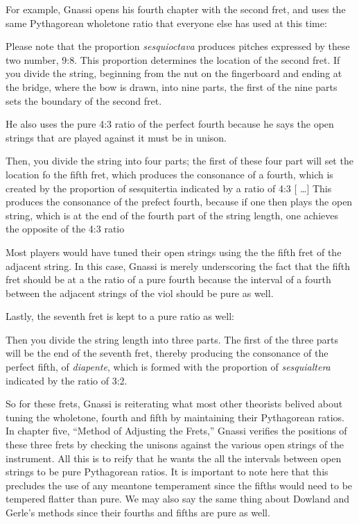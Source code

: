 For example, Gnassi opens his fourth chapter with the second fret, and uses the same
Pythagorean wholetone ratio that everyone else has used at this time:

\begin{blocks}
Please note that the proportion \emph{sesquioctava} produces pitches expressed
by these two number, 9:8.  This proportion determines the location of the second
fret.  If you divide the string, beginning from the nut on the fingerboard and
ending at the bridge, where the bow is drawn, into nine parts, the first of the
nine parts sets the boundary of the second fret.
\end{blocks}

He also uses the pure 4:3 ratio of the
perfect fourth because he says the open strings that are played against it must
be in unison.

\begin{blocks}
Then, you divide the string into four parts; the first of these four part will
set the location fo the fifth fret, which produces the consonance of a fourth,
which is created by the proportion of sesquitertia indicated by a ratio of 4:3
[ \ldots ] This produces the consonance of the prefect fourth, because if
one then plays the open string, which is at the end of the fourth part of the
string length, one achieves the opposite of the 4:3 ratio
\end{blocks}

Most players would have tuned their open strings using the the fifth fret of the
adjacent string.  In this case, Gnassi is merely underscoring the fact that the
fifth fret should be at a the ratio of a pure fourth because the interval of a fourth
between the adjacent strings of the viol should be pure as well.

Lastly, the seventh fret is kept to a pure ratio as well:

\begin{blocks}
Then you divide the string length into three parts. The first of the three parts will be the
end of the seventh fret, thereby producing the consonance of the perfect fifth, of \textit{diapente},
which is formed with the proportion of \textit{sesquialtera} indicated by the ratio of 3:2.
\end{blocks}

So for these frets, Gnassi is reiterating what most other theorists belived about tuning
the wholetone, fourth and fifth by maintaining their Pythagorean ratios.
In chapter five, ``Method of Adjusting the
Frets,'' Gnassi verifies the positions of these three frets by checking the unisons against
the various open strings of the instrument.  All this is to reify that he
wants the all the intervals between open strings to be pure Pythagorean ratios.  It is important
to note here that this precludes the use of any meantone temperament since the fifths would need
to be tempered flatter than pure.  We may also say the same thing about Dowland and Gerle's
methods since their fourths and fifths are pure as well.

